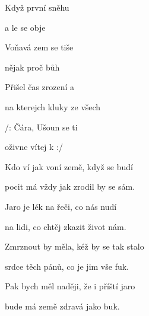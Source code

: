 

\zs
Když první   sněhu 

a  le se  obje

Voňavá zem se  tiše 

 nějak   proč bůh
\ks



\zr
Přišel čas  {zroz}ení a 

na kterejch  {klu}ky ze všech 

/:   Čára, Ušoun se ti 

oživne   vítej k  :/
\kr

\zs
Kdo ví jak voní země, když se budí

pocit má vždy jak zrodil by se sám.

Jaro je lék na řeči, co nás nudí

na lidi, co chtěj zkazit život nám.
\ks


\zr \kr


\zs
Zmrznout by měla, kéž by se tak stalo

srdce těch pánů, co je jim vše fuk.

Pak bych měl naději, že i příští jaro

bude má země zdravá jako buk.
\ks

\zr \kr

\kp






